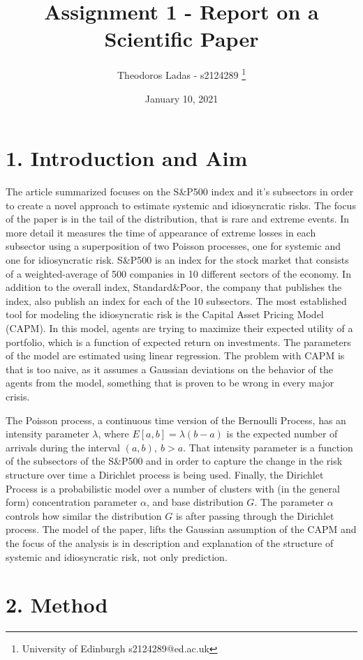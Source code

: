 \documentclass[fleqn, a4paper]{report}
\title{Assignment 1 - Report on a Scientific Paper}
\author{
Theodoros Ladas - s2124289 
\footnote{University of Edinburgh s2124289@ed.ac.uk}
}
\date{January 10, 2021}
\begin{document}
\maketitle

\section*{1. Introduction and Aim}
The article summarized  \cite{rodriguez2017assessing} focuses on the S\&P500 index and it's subsectors in order to create a novel approach to estimate systemic and idiosyncratic risks. The focus of the paper is in the tail of the distribution, that is rare and extreme events. In more detail it measures the time of appearance of extreme losses in each subsector using a superposition of two Poisson processes, one for systemic and one for idiosyncratic risk. S\&P500 is an index for the stock market that consists of a weighted-average of 500 companies in 10 different sectors of the economy. In addition to the overall index, Standard\&Poor, the company that publishes the index, also publish an index for each of the 10 subsectors. The most established tool for modeling the idiosyncratic risk is the Capital Asset Pricing Model (CAPM). In this model, agents are trying to maximize their expected utility of a portfolio, which is a function of expected return on investments. The parameters of the model are estimated using linear regression. The problem with CAPM is that is too naive, as it assumes a Gaussian deviations on the behavior of the agents from the model, something that is proven to be wrong in every major crisis.

The Poisson process, a continuous time version of the Bernoulli Process, has an intensity parameter $\lambda$, where $E[a,b] = \lambda(b-a)$ is the expected number of arrivals during the interval $(a,b), ~b>a$. That intensity parameter is a function of the subsectors of the S\&P500 and in order to capture the change in the risk structure over time a Dirichlet process is being used. Finally, the Dirichlet Process is a probabilistic model over a number of clusters with (in the general form) concentration parameter $\alpha$, and base distribution $G$. The parameter $\alpha$ controls how similar the distribution $G$ is after passing through the Dirichlet process. The model of the paper, lifts the Gaussian assumption of the CAPM and the focus of the analysis is in description and explanation of the structure of systemic and idiosyncratic risk, not only prediction.
\section*{2. Method}
\end{document}
